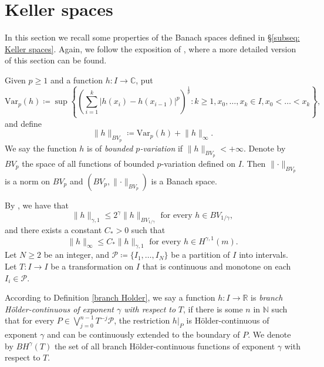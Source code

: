 \documentclass[10pt,a4paper]{amsart}
\numberwithin{equation}{section} %
\numberwithin{figure}{section} %
\newcommand{\C}{\mathbb{C}}
\newcommand{\N}{\mathbb{N}}
\newcommand{\R}{\mathbb{R}}
\renewcommand{\=}{\coloneqq}
\begin{document}
\section{Keller spaces}\label{sec: Keller spaces}
In this section we recall some properties of the Banach spaces defined in \S\ref{subseq: Keller spaces}. Again, we follow the exposition of \cite{Juan1}, where a more detailed version of this section can be found.

Given $p\geq 1$ and a function $h\colon I\to\C$, put
\begin{equation*}
    \text{Var}_p(h)\= \sup\left\{\left(\sum_{i=1}^k |h(x_i)-h(x_{i-1})|^p\right)^{\frac{1}{p}} \colon k\geq 1,x_0,\ldots,x_k\in I, x_0<\ldots<x_k\right\},
\end{equation*}
and define
\begin{equation*}
    \lVert h \rVert_{BV_p} \= \text{Var}_p(h) + \lVert h \rVert_{\infty}. 
\end{equation*}
We say the function $h$ is of \emph{bounded $p$-variation} if $\lVert h \rVert_{BV_p}<+\infty$. Denote by $BV_p$ the space of all functions of bounded $p$-variation defined on $I$. Then $\lVert\cdot\rVert_{BV_p}$ is a norm on $BV_p$ and $(BV_p, \lVert\cdot\rVert_{BV_p} )$ is a Banach space. 

By \cite[Proposition 4.1]{Juan1}, we have that
\begin{equation}\label{contencion2 Keller}
    \lVert h \lVert_{\gamma,1}\leq 2^{\gamma}\lVert h \rVert_{BV_{1/\gamma}} \text{ for every } h\in BV_{1/\gamma},
\end{equation}
and there exists a constant $C_*>0$ such that
\begin{equation}\label{contencion3 Keller}
    \lVert h \rVert_{\infty} \leq C_* \lVert h \rVert_{\gamma,1} \text{ for every } h\in H^{\gamma,1}(m).
\end{equation}
Let $N\geq 2$ be an integer, and $\mathcal{P}\=\{I_1,\ldots,I_N\}$ be a partition of $I$ into intervals. Let $T\colon I\to I$ be a transformation on $I$ that is continuous and monotone on each $I_i\in \mathcal{P}$.

According to Definition \ref{branch Holder}, we say a function $h\colon I\to \R$ is \emph{branch Hölder-continuous of exponent $\gamma$ with respect to} $T$, if there is some $n$ in $\N$ such that for every $P \in \bigvee_{j=0}^{n-1}T^{-j}\mathcal{P}$, the restriction $h|_{P}$ is Hölder-continuous of exponent $\gamma$ and can be continuously extended to the boundary of $P$. We denote by $BH^{\gamma}(T)$ the set of all branch Hölder-continuous functions of exponent $\gamma$ with respect to $T$.
\end{document}
